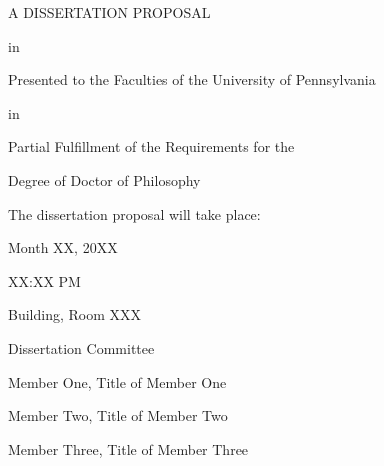 \hypersetup{pageanchor=false}
\begin{titlepage}
\thispagestyle{empty} %
\begin{center}


\mytitle

\myauthor

A DISSERTATION PROPOSAL

in 

\mydepartment 

Presented to the Faculties of the University of Pennsylvania

in 

Partial Fulfillment of the Requirements for the

Degree of Doctor of Philosophy

\myyear

\vfill

The dissertation proposal will take place:

Month XX, 20XX 

XX:XX PM

Building, Room XXX

\vfill
\end{center}

\vfill %


\begin{flushleft}

%
%
%
%
%
%
%
%
%
%

\singlespacing

Dissertation Committee %

\blankline

Member One, Title of Member One

Member Two, Title of Member Two

Member Three, Title of Member Three

\end{flushleft}

\end{titlepage}
\hypersetup{pageanchor=true}

